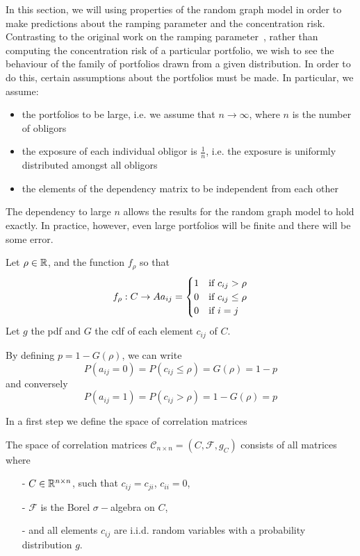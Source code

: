 In this section, we will using properties of the random graph model in order to make predictions about the ramping parameter and the concentration risk.
Contrasting to the original work on the ramping parameter~\cite{Sindel:2009vd}, rather than computing the concentration risk of a particular portfolio, we wish to see the behaviour of the family of portfolios drawn from a given distribution.
In order to do this, certain assumptions about the portfolios must be made.
In particular, we assume:
\begin{itemize}
	\item the portfolios to be large, i.e. we assume that $n \rightarrow \infty$, where $n$ is the number of obligors
	\item the exposure of each individual obligor is $\frac{1}{n}$, i.e. the exposure is uniformly distributed amongst all obligors
	\item the elements of the dependency matrix to be independent from each other
\end{itemize}

\begin{remark}The dependency to large $n$ allows the results for the random graph model to hold exactly.
In practice, however, even large portfolios will be finite and there will be some error.
\end{remark}





Let $\rho \in {\mathbb R}$, and the function $f_\rho$ so that
\begin{equation}
\label{eqn:function}
f_\rho: C \rightarrow A\\
\\
a_{ij} = \begin{cases} 1 & \text{if } c_{ij} > \rho \\
                       0 & \text{if } c_{ij} \le \rho \\
                       0 & \text{if } i = j
        \end{cases}
\end{equation}
Let $g$ the pdf and $G$ the cdf of each element $c_{ij}$ of $C$.

By defining $p = 1-G(\rho)$, we can write
$$
P( a_{ij} = 0 ) = P(c_{ij} \le \rho) = G(\rho) = 1-p
$$
and conversely
$$
P( a_{ij} = 1 ) = P(c_{ij} > \rho) = 1 - G(\rho) = p
$$

In a first step we define the space of correlation matrices 
\begin{definition}
The space of correlation matrices $\mathcal{C}_{n\times n} = \left( C, \mathcal{F},  g_C \right)$ consists of all matrices where
\begin{itemize}
\item[-] $C \in {\mathbb R}^{n \times n}$, such that $c_{ij} = c_{ji}$, $c_{ii} = 0$, 
\item[-] $\mathcal{F}$ is the Borel $\sigma-$algebra on $C$,
\item[-] and all elements $c_{ij}$ are i.i.d. random variables with a probability distribution $g$.
\end{itemize}
\end{definition}

